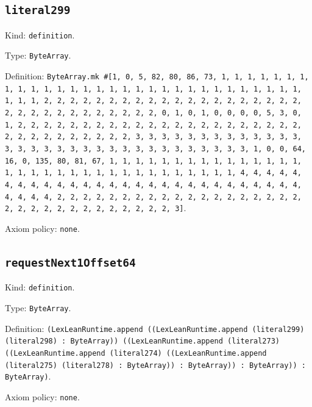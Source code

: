 \documentclass[11pt]{article}
\begin{document}
\subsection*{\texttt{literal299}}
\noindent Kind: \texttt{definition}.\par
\noindent Type: \texttt{ByteArray}.\par
\noindent Definition: \texttt{ByteArray.mk \#[1, 0, 5, 82, 80, 86, 73, 1, 1, 1, 1, 1, 1, 1, 1, 1, 1, 1, 1, 1, 1, 1, 1, 1, 1, 1, 1, 1, 1, 1, 1, 1, 1, 1, 1, 1, 1, 1, 1, 1, 2, 2, 2, 2, 2, 2, 2, 2, 2, 2, 2, 2, 2, 2, 2, 2, 2, 2, 2, 2, 2, 2, 2, 2, 2, 2, 2, 2, 2, 2, 2, 2, 0, 1, 0, 1, 0, 0, 0, 0, 5, 3, 0, 1, 2, 2, 2, 2, 2, 2, 2, 2, 2, 2, 2, 2, 2, 2, 2, 2, 2, 2, 2, 2, 2, 2, 2, 2, 2, 2, 2, 2, 2, 2, 2, 2, 3, 3, 3, 3, 3, 3, 3, 3, 3, 3, 3, 3, 3, 3, 3, 3, 3, 3, 3, 3, 3, 3, 3, 3, 3, 3, 3, 3, 3, 3, 3, 3, 1, 0, 0, 64, 16, 0, 135, 80, 81, 67, 1, 1, 1, 1, 1, 1, 1, 1, 1, 1, 1, 1, 1, 1, 1, 1, 1, 1, 1, 1, 1, 1, 1, 1, 1, 1, 1, 1, 1, 1, 1, 1, 1, 4, 4, 4, 4, 4, 4, 4, 4, 4, 4, 4, 4, 4, 4, 4, 4, 4, 4, 4, 4, 4, 4, 4, 4, 4, 4, 4, 4, 4, 4, 4, 4, 2, 2, 2, 2, 2, 2, 2, 2, 2, 2, 2, 2, 2, 2, 2, 2, 2, 2, 2, 2, 2, 2, 2, 2, 2, 2, 2, 2, 2, 2, 2, 2, 3]}.\par
\noindent Axiom policy: \texttt{none}.\par
\subsection*{\texttt{requestNext1Offset64}}
\noindent Kind: \texttt{definition}.\par
\noindent Type: \texttt{ByteArray}.\par
\noindent Definition: \texttt{(LexLeanRuntime.append ((LexLeanRuntime.append (literal299) (literal298) : ByteArray)) ((LexLeanRuntime.append (literal273) ((LexLeanRuntime.append (literal274) ((LexLeanRuntime.append (literal275) (literal278) : ByteArray)) : ByteArray)) : ByteArray)) : ByteArray)}.\par
\noindent Axiom policy: \texttt{none}.\par
\end{document}
